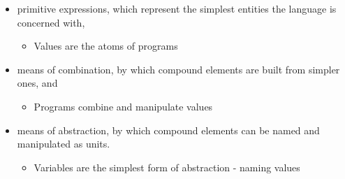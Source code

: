 \documentclass{article}
\begin{document}
\begin{itemize}
\item primitive expressions, which represent the simplest entities the language is concerned with,
\begin{itemize}
\item Values are the atoms of programs
\end{itemize}

\item means of combination, by which compound elements are built from simpler ones, and
\begin{itemize}
\item Programs combine and manipulate values
\end{itemize}

\item means of abstraction, by which compound elements can be named and manipulated as units.
\begin{itemize}
\item Variables are the simplest form of abstraction - naming values
\end{itemize}

\end{itemize}
\end{document}
